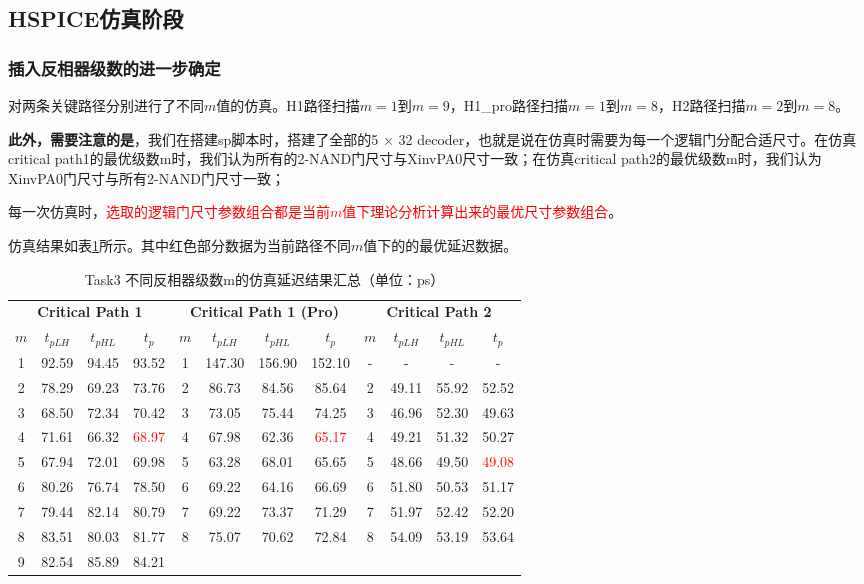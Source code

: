 \documentclass[UTF8,12pt,a4paper]{ctexart}
\begin{document}
\subsection{HSPICE仿真阶段}

\subsubsection{插入反相器级数的进一步确定}

对两条关键路径分别进行了不同$m$值的仿真。H1路径扫描$m=1$到$m=9$，H1\_pro路径扫描$m = 1$到$m = 8$，H2路径扫描$m = 2$到$m = 8$。

\textbf{此外，需要注意的是}，我们在搭建sp脚本时，搭建了全部的5 $\times$ 32 decoder，也就是说在仿真时需要为每一个逻辑门分配合适尺寸。在仿真critical path1的最优级数m时，我们认为所有的2-NAND门尺寸与XinvPA0尺寸一致；在仿真critical path2的最优级数m时，我们认为XinvPA0门尺寸与所有2-NAND门尺寸一致；

每一次仿真时，\textcolor{red}{选取的逻辑门尺寸参数组合都是当前$m$值下理论分析计算出来的最优尺寸参数组合}。

仿真结果如表\ref{tab:task3_sim_m_all}所示。其中红色部分数据为当前路径不同$m$值下的的最优延迟数据。

\begin{table}[htbp]
    \centering
    \caption{Task3 不同反相器级数m的仿真延迟结果汇总（单位：ps）}
    \label{tab:task3_sim_m_all}
    \scriptsize %
    \setlength{\tabcolsep}{1.5pt} %
    \begin{tabular}{cccc|cccc|cccc}
    \toprule
    \multicolumn{4}{c|}{\textbf{Critical Path 1}} & \multicolumn{4}{c|}{\textbf{Critical Path 1 (Pro)}} & \multicolumn{4}{c}{\textbf{Critical Path 2}} \\
    $m$ & $t_{pLH}$ & $t_{pHL}$ & $t_p$ & $m$ & $t_{pLH}$ & $t_{pHL}$ & $t_p$ & $m$ & $t_{pLH}$ & $t_{pHL}$ & $t_p$ \\
    \midrule
    1 & 92.59 & 94.45 & 93.52 & 1 & 147.30 & 156.90 & 152.10 & - & - & - & - \\
    2 & 78.29 & 69.23 & 73.76 & 2 & 86.73 & 84.56 & 85.64 & 2 & 49.11 & 55.92 & 52.52 \\
    3 & 68.50 & 72.34 & 70.42 & 3 & 73.05 & 75.44 & 74.25 & 3 & 46.96 & 52.30 & 49.63 \\
    4 & 71.61 & 66.32 & \textcolor{red}{68.97} & 4 & 67.98 & 62.36 & \textcolor{red}{65.17} & 4 & 49.21 & 51.32 & 50.27 \\
    5 & 67.94 & 72.01 & 69.98 & 5 & 63.28 & 68.01 & 65.65 & 5 & 48.66 & 49.50 & \textcolor{red}{49.08} \\
    6 & 80.26 & 76.74 & 78.50 & 6 & 69.22 & 64.16 & 66.69 & 6 & 51.80 & 50.53 & 51.17 \\
    7 & 79.44 & 82.14 & 80.79 & 7 & 69.22 & 73.37 & 71.29 & 7 & 51.97 & 52.42 & 52.20 \\
    8 & 83.51 & 80.03 & 81.77 & 8 & 75.07 & 70.62 & 72.84 & 8 & 54.09 & 53.19 & 53.64 \\
    9 & 82.54 & 85.89 & 84.21 & & & & & & & & \\
    \bottomrule
    \end{tabular}
\end{table}
\end{document}
